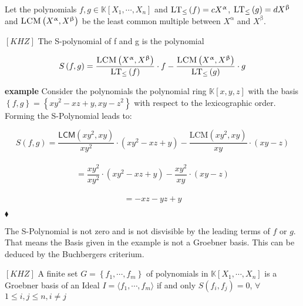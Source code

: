 Let the polynomials $f,g \in \mathbb{K}\left[X_{1}, \cdots, X_{n}\right] $ and $\textsc{LT}_{\leq}\left(f \right) = cX^{\upalpha} $, $\textsc{LT}_{\leq}\left(g \right) = dX^{\upbeta} $ and $\textsc{LCM}\left( X^{\upalpha},X^{\upbeta}\right) $ be the least common multiple between $X^{\upalpha}$ and $X^{\upbeta}$. 

\begin{env_definition}[S-Polynomial]
$\left[ KHZ\right] $ The S-polynomial of f and g is the polynomial
\begin{center}
\[ S\left( f,g\right) = \frac{\textsc{LCM}\left( X^{\upalpha}, X^{\upbeta}\right) }{\textsc{LT}_{\leq}\left( f\right) } \cdot f - \frac{ \textsc{LCM}\left( X^{\upalpha}, X^{\upbeta}\right) }{\textsc{LT}_{\leq}\left( g\right) } 
\cdot g \]
\end{center}

\end{env_definition}

\textbf{example} Consider the polynomials the polynomial ring $\mathbb{K}\left[ x,y,z\right] $ with
the basis $\left\lbrace f,g\right\rbrace = \left\lbrace xy^{2}-xz+y,xy-z^{2} \right\rbrace $ with respect to the lexicographic order.\\
Forming the S-Polynomial leads to:
\begin{center}
\[
 S\left( f,g\right) = \frac{\textsf{LCM}\left( xy^{2}, xy \right) } {xy^{2} } \cdot \left(  xy^{2}-xz+y\right) - \frac{\textrm{LCM}\left( xy^{2}, xy \right) } {xy } \cdot \left( xy-z \right)   
 \]  \\
 \[ = \frac{xy^{2}}{xy^{2}} \cdot \left( xy^{2}-xz+y\right) - \frac{xy^{2}}{xy} \cdot \left( xy-z\right)   \] \\
 \[ = -xz-yz+y  \]


\end{center}

\begin{flushright}
$\blacklozenge$
\end{flushright} 

The S-Polynomial is not zero and is not disvisible by the leading terms of $f$ or $g$. That means the Basis given in the example is not a Groebner basis. This can be deduced by the Buchbergers criterium.

\begin{env_definition}
$\left[ KHZ\right] $ A finite set $G = \left\lbrace f_{1}, \cdots , f_{m} \right\rbrace$ of polynomials in $ \mathbb{K}\left[X_{1}, \cdots, X_{n}\right] $ is a Groebner basis of an Ideal 
$I = \langle f_{1}, \cdots , f_{m} \rangle $ if and only $S\left( f_{i},f_{j}\right) = 0$, $ \forall$  $1 \leq i,j \leq n, i\neq j $

\end{env_definition}

